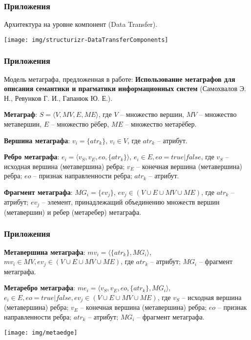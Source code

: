 \documentclass[pdf, hyperref={unicode}, aspectratio=169]{beamer}
\begin{document}
\begin{frame}
\frametitle{Приложения}
	Архитектура на уровне компонент (Data Transfer).

	\begin{center}
		\texttt{[image: img/structurizr-DataTransferComponents]}
	\end{center}
\end{frame}


\begin{frame}
\frametitle{Приложения}
	Модель метаграфа, предложенная в работе: \textbf{Использование метаграфов для описания семантики и прагматики информационных систем} (Самохвалов Э. Н., Ревунков Г. И., Гапанюк Ю. Е.).

	\textbf{Метаграф}: $S = \langle V, MV, E, ME \rangle$, где $V$ -- множество вершин, $MV$ -- множество метавершин, $E$ -- множество рёбер, $ME$ -- множество метарёбер.

	\textbf{Вершина метаграфа}: $v_i = \{ atr_k \}$, $v_i \in V$, где $atr_k$ -- атрибут.

	\textbf{Ребро метаграфа}: $e_i = \langle v_S, v_E, eo, \{ atr_k \} \rangle$, $e_i \in E, eo = true | false$, где $v_S$ -- исходная вершина (метавершина) ребра; $v_E$ -- конечная вершина (метавершина) ребра; $eo$ -- признак направленности ребра; $atr_k$ -- атрибут.

	\textbf{Фрагмент метаграфа}: $MG_i = \{ ev_j \}$, $ev_j \in (V \cup E \cup MV \cup ME)$, где $atr_k$ -- атрибут; $ev_j$ -- элемент, принадлежащий объединению множеств вершин (метавершин) и ребер (метаребер) метаграфа.
\end{frame}


\begin{frame}
\frametitle{Приложения}
	\textbf{Метавершина метаграфа}: $mv_i = \langle \{ atr_k \}, MG_i \rangle$, $mv_i \in MV, ev_j \in (V \cup E \cup MV \cup ME)$, где $atr_k$ -- атрибут; $MG_i$ -- фрагмент метаграфа.

	\textbf{Метаребро метаграфа}: $me_i = \langle v_S, v_E, eo, \{ atr_k \}, MG_i \rangle$, $e_i \in E, eo = true | false, ev_j \in (V \cup E \cup MV \cup ME)$, где $v_S$ -- исходная вершина (метавершина) ребра; $v_E$ -- конечная вершина (метавершина) ребра; $eo$ -- признак направленности ребра; $atr_k$ -- атрибут; $MG_i$ -- фрагмент метаграфа.

	\begin{center}
		\texttt{[image: img/metaedge]}
	\end{center}
\end{frame}
\end{document}
